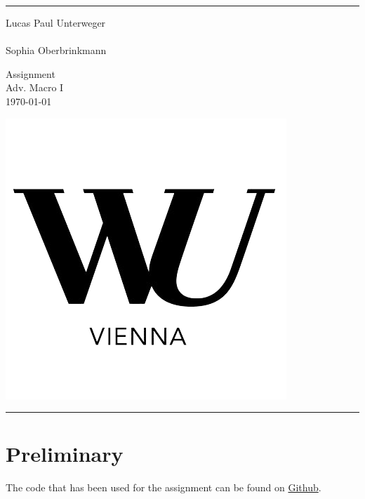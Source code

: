 \documentclass[a4paper,11pt]{article}
\begin{document}

\fancyhead[C]{}
\hrule  %
\begin{minipage}{0.295\textwidth} 
\raggedright
\footnotesize
Lucas Paul Unterweger \hfill\\   
\hfill\\
Sophia Oberbrinkmann
\end{minipage}
\begin{minipage}{0.4\textwidth} 
\centering 
\large 
Assignment\\ 
\normalsize 
Adv. Macro I\\ 
\today \\
\end{minipage}
\begin{minipage}{0.295\textwidth} 
\raggedleft
\includegraphics[scale=0.15]{style/wu_transparent.png}\\
\end{minipage}
\hrule 
\bigskip

\section{Preliminary}
The code that has been used for the assignment can be found on \href{https://github.com/therealLucasPaul/AdvMacroeconomics1_2023}{Github}.

\tableofcontents
\pagebreak
\listoffigures
\listoftables
\pagebreak
\end{document}

